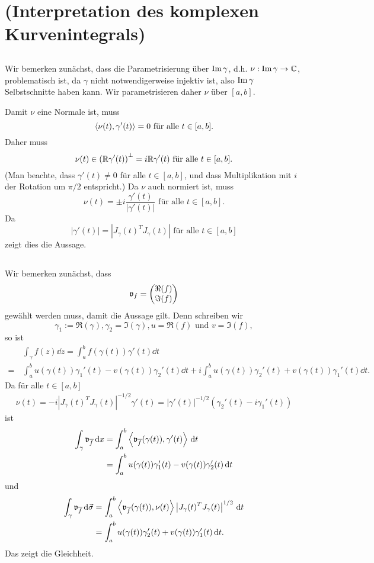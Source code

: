 \documentclass[a4paper,10pt]{article}
\begin{document}
\section{(Interpretation des komplexen Kurvenintegrals)}


\subsection{}
Wir bemerken zunächst, dass die Parametrisierung über $\operatorname{Im} \gamma$, d.h. $\nu : \operatorname{Im} \gamma \to \mathbb{C}$, problematisch ist, da $\gamma$ nicht notwendigerweise injektiv ist, also $\operatorname{Im} \gamma$ Selbstschnitte haben kann. Wir parametrisieren daher $\nu$ über $[a,b]$.

Damit $\nu$ eine Normale ist, muss
\[
 \left\langle \nu(t), \gamma'(t) \right\rangle = 0 \text{ für alle } t \in [a,b].
\]
Daher muss
\[
 \nu(t) \in \left( \mathbb{R} \gamma'(t) \right)^{\bot} = i \mathbb{R} \gamma'(t) \text{ für alle } t \in [a,b].
\]
(Man beachte, dass $\gamma'(t) \neq 0$ für alle $t \in [a,b]$, und dass Multiplikation mit $i$ der Rotation um $\pi/2$ entspricht.) Da $\nu$ auch normiert ist, muss
\[
 \nu(t) = \pm i \frac{\gamma'(t)}{|\gamma'(t)|} \text{ für alle } t \in [a,b].
\]
Da
\[
 |\gamma'(t)| = |J_\gamma(t)^T J_\gamma(t)| \text{ für alle } t \in [a,b]
\]
zeigt dies die Aussage.


\subsection{}
Wir bemerken zunächst, dass
\[
 \mathfrak{v}_f = \begin{pmatrix}\Re(f) \\ \Im(f)\end{pmatrix}
\]
gewählt werden muss, damit die Aussage gilt. Denn schreiben wir
\[
 \gamma_1 := \Re(\gamma), \gamma_2 = \Im(\gamma), u = \Re(f) \text{ und } v = \Im(f),
\]
so ist
\begin{align*}
 &\, \int_\gamma f(z) \dd{z}
 = \int_a^b f(\gamma(t)) \gamma'(t) \dd{t} \\
 =&\, \int_a^b u(\gamma(t))\gamma_1'(t) - v(\gamma(t))\gamma_2'(t) \dd{t}
   + i \int_a^b u(\gamma(t)) \gamma_2'(t) + v(\gamma(t)) \gamma_1'(t) \dd{t}.
\end{align*}
Da für alle $t \in [a,b]$
\begin{align*}
 \nu(t) = -i\left|J_\gamma(t)^T J_\gamma(t)\right|^{-1/2} \gamma'(t) = |\gamma'(t)|^{-1/2} (\gamma_2'(t) - i\gamma_1'(t))
\end{align*}
ist
\begin{align*}
 \int_\gamma \mathfrak{v}_{\overline{f}} \,\text{d}x
 &= \int_a^b \left\langle \mathfrak{v}_{\overline{f}}(\gamma(t)), \gamma'(t) \right\rangle \,\text{d}t \\
 &= \int_a^b u(\gamma(t))\gamma_1'(t) - v(\gamma(t))\gamma_2'(t) \,\text{d}t
\end{align*}
und
\begin{align*}
 \int_\gamma \mathfrak{v}_{\overline{f}} \,\text{d}\vec{\sigma}
 &= \int_a^b \left\langle \mathfrak{v}_{\overline{f}}(\gamma(t)), \nu(t) \right\rangle \left|J_\gamma(t)^T J_\gamma(t)\right|^{1/2} \,\text{d}t \\
 &= \int_a^b u(\gamma(t))\gamma_2'(t) + v(\gamma(t))\gamma_1'(t) \,\text{d}t.
\end{align*}
Das zeigt die Gleichheit.
\end{document}
